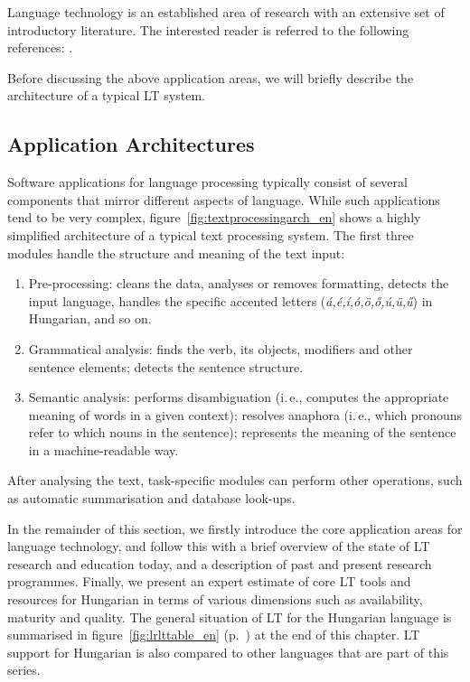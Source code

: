 \begin{multicols}{2}
  Language technology is an established area of research with an extensive set of introductory literature. The interested reader is referred to the following references:  \cite{jurafsky-martin01, manning-schuetze1, lt-world1, lt-survey1}.

  Before discussing the above application areas, we will briefly describe the architecture of a typical LT system.

  \subsection{Application Architectures}

  Software applications for language processing typically consist of several components that mirror different aspects of language. While such applications tend to be very complex, figure~\ref{fig:textprocessingarch_en} shows a highly simplified architecture of a typical text processing system. The first three modules handle the structure and meaning of the text input:

  \begin{enumerate}
  \item Pre-processing: cleans the data, analyses or removes formatting, detects the input language, handles the specific accented letters (\textit{á,é,í,ó,ö,ő,ú,ü,ű}) in Hungarian, and so on.
  \item Grammatical analysis: finds the verb, its objects, modifiers and other sentence elements; detects the sentence structure.
  \item Semantic analysis: performs disambiguation (i.\,e., computes the appropriate meaning of words in a given context); resolves anaphora (i.\,e., which pronouns refer to which nouns in the sentence); represents the meaning of the sentence in a machine-readable way.
  \end{enumerate}

  After analysing the text, task-specific modules can perform other operations, such as automatic summarisation and database look-ups.

  In the remainder of this section, we firstly introduce the core application areas for language technology, and follow this with a brief overview of the state of LT research and education today, and a description of past and present research programmes. Finally, we present an expert estimate of core LT tools and resources for Hungarian in terms of various dimensions such as availability, maturity and quality. The general situation of LT for the Hungarian language is summarised in figure~\ref{fig:lrlttable_en} (p.~\pageref{fig:lrlttable_en}) at the end of this chapter. LT support for Hungarian is also compared to other languages that are part of this series.


\end{multicols}
